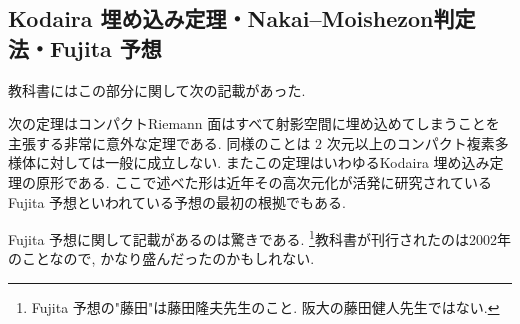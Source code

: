 \documentclass[dvipdfmx,a4paper,11pt]{article} %
\theoremstyle{definition}
\numberwithin{equation}{section}
\begin{document}
\subsection{Kodaira 埋め込み定理・Nakai--Moishezon判定法・Fujita 予想}
教科書にはこの部分に関して次の記載があった.
\begin{tcolorbox}[mybox]
次の定理はコンパクトRiemann 面はすべて射影空間に埋め込めてしまうことを主張する非常に意外な定理である. 同様のことは $2$ 次元以上のコンパクト複素多様体に対しては一般に成立しない. 
またこの定理はいわゆるKodaira 埋め込み定理の原形である. ここで述べた形は近年その高次元化が活発に研究されているFujita 予想といわれている予想の最初の根拠でもある.
\end{tcolorbox}
Fujita 予想に関して記載があるのは驚きである. \footnote{Fujita 予想の"藤田"は藤田隆夫先生のこと. 阪大の藤田健人先生ではない.}教科書が刊行されたのは2002年のことなので, かなり盛んだったのかもしれない. 


\end{document}
